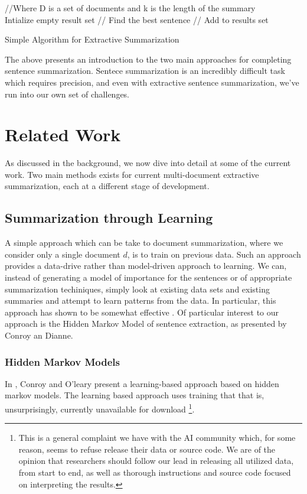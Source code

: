 \documentclass[10pt]{article}
\begin{document}
\begin{algorithm}
  \begin{algorithmic}
     //Where D is a set of documents and k is the length of the summary
     \\ Intialize empty result set
       // Find the best sentence
         // Add to results set
    \EndWhile
    \EndProcedure{}
  \end{algorithmic}
  \caption{Simple Algorithm for Extractive Summarization}
\end{algorithm}

The above presents an introduction to the two main approaches for completing sentence summarization. Sentece summarization is an incredibly difficult task which requires precision, and even with extractive sentence summarization, we've run into our own set of challenges.

\section{Related Work}
As discussed in the background, we now dive into detail at some of the current work. Two main methods exists for current multi-document extractive summarization, each at a different stage of development.

\subsection{Summarization through Learning}
A simple approach which can be take to document summarization, where we consider only a single document $d$, is to train on previous data. Such an approach provides  a data-drive rather than model-driven approach to learning. We can, instead of generating a model of importance for the sentences or of appropriate summarization techiniques, simply look at existing data sets and existing summaries and attempt to learn patterns from the data. In particular, this approach has shown to be somewhat effective \cite{survey}. Of particular interest to our approach is the Hidden Markov Model of sentence extraction, as presented by Conroy an Dianne.

\subsubsection{Hidden Markov Models}
In \cite{hmm_summary}, Conroy and O'leary present a learning-based approach based on hidden markov models. The learning based approach uses training that that is, unsurprisingly, currently unavailable for download \footnote{This is a general complaint we have with the AI community which, for some reason, seems to refuse release their data or source code. We are of the opinion that researchers should follow our lead in releasing all utilized data, from start to end, as well as thorough instructions and source code focused on interpreting the results.}. \\
\end{document}
